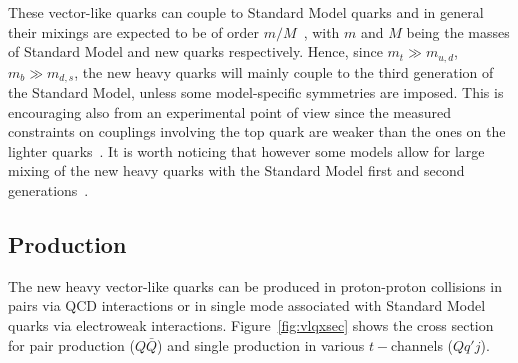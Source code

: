 These vector-like quarks can couple to Standard Model quarks and
in general their mixings are expected to be of order $m/M$~\cite{delAguila:1982fs},
 with $m$ and $M$ being
the masses of Standard Model and new quarks respectively.
Hence, since $m_t \gg m_{u,d}$, $m_b \gg m_{d,s}$,
the new heavy quarks will mainly couple to the third
generation of the Standard Model, unless some model-specific
symmetries are imposed.
This is encouraging also from an experimental point of view
since the measured constraints on couplings involving the
top quark are weaker than the ones on the lighter 
quarks~\cite{delAguila:1998tp,AguilarSaavedra:2002kr}.
It is worth noticing that however some models allow for 
large mixing of the new heavy quarks with the Standard Model
first and second generations~\cite{Atre:2008iu}.



\subsection{Production}\label{sec:vlqprod}

The new heavy vector-like quarks can be produced in
proton-proton collisions in pairs via QCD interactions
or in single mode associated with Standard Model quarks
via electroweak interactions.
Figure~\ref{fig:vlqxsec} shows the cross section for
pair production ($Q\bar{Q}$) and single production 
in various $t-$channels ($Qq'j$).

